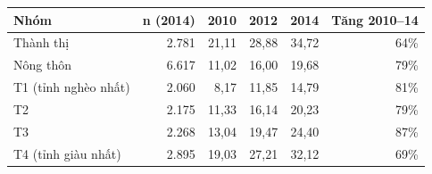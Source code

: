 \begin{tabular}{lrrrrr}
\toprule
Nhóm & n (2014) & 2010 & 2012 & 2014 & Tăng 2010–14 \\
\midrule
Thành thị & 2.781 & 21,11 & 28,88 & 34,72 & 64\% \\
Nông thôn & 6.617 & 11,02 & 16,00 & 19,68 & 79\% \\
T1 (tỉnh nghèo nhất) & 2.060 & 8,17 & 11,85 & 14,79 & 81\% \\
T2 & 2.175 & 11,33 & 16,14 & 20,23 & 79\% \\
T3 & 2.268 & 13,04 & 19,47 & 24,40 & 87\% \\
T4 (tỉnh giàu nhất) & 2.895 & 19,03 & 27,21 & 32,12 & 69\% \\
\bottomrule
\end{tabular}
